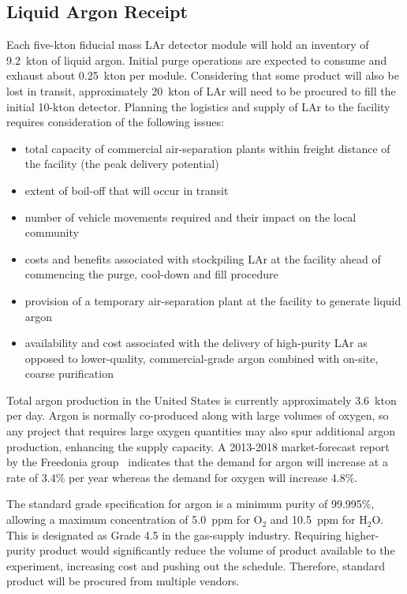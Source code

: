 \subsection{Liquid Argon Receipt}

Each five-kton fiducial mass LAr detector module will hold an inventory of 9.2~kton of liquid argon.  Initial purge operations are expected to consume and exhaust about 0.25~kton per module.  Considering that some product will also be lost in transit, approximately 20~kton of LAr will need to be procured to fill the initial 10-kton detector.  Planning the logistics and supply of LAr to the facility requires consideration of the following issues:

\begin{itemize}
\item  total capacity of commercial air-separation plants within freight distance of the facility (the peak delivery potential)
\item extent of boil-off that will occur in transit
\item  number of vehicle movements required and their impact on the local community
\item costs and benefits associated with stockpiling LAr at the facility ahead of commencing the purge, cool-down and fill procedure
\item provision of a temporary air-separation plant at the facility to generate liquid argon
\item  availability and cost associated with the delivery of high-purity LAr as opposed to lower-quality, commercial-grade argon combined with on-site, coarse purification
\end{itemize}

Total argon production in the United States is currently approximately 3.6~kton per day.  Argon is normally co-produced along with large volumes 
of oxygen, so any project that requires large oxygen quantities may also spur additional argon production, enhancing the
supply capacity.  A 2013-2018 market-forecast report by the Freedonia group~\cite{freedonia} indicates that the demand for argon will increase at a rate of 3.4\% per year whereas the demand for oxygen will increase 4.8\%.  

The standard grade specification for argon is a minimum purity of 99.995\%, allowing a maximum concentration of 5.0~ppm for O$_2$ and 10.5~ppm for H$_{2}$O.  This is designated as Grade 4.5 in the gas-supply industry.  Requiring higher-purity product would significantly reduce the volume of product available to the experiment, increasing cost and pushing out the schedule.  
Therefore, standard product will be procured from multiple vendors.  


